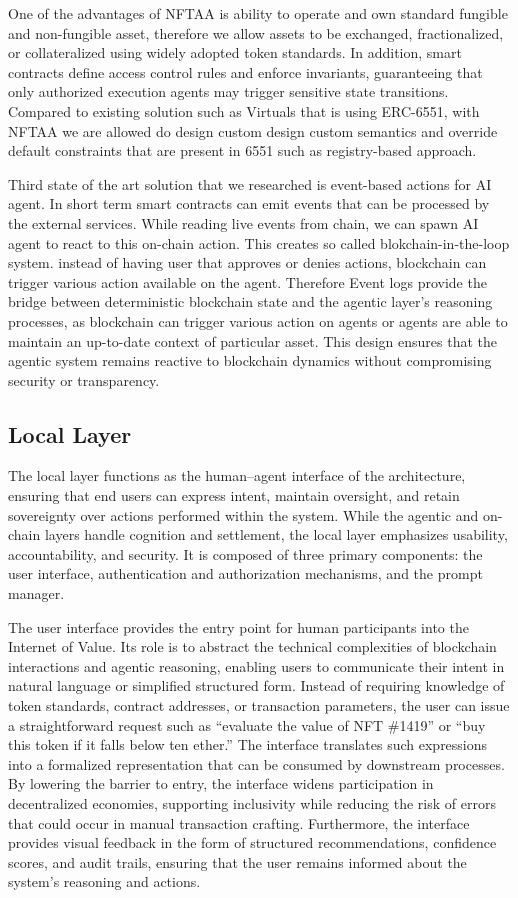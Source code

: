 One of the advantages of NFTAA is ability to operate and own standard fungible and non-fungible asset, therefore we allow assets to be exchanged, fractionalized, or collateralized using widely adopted token standards. In addition, smart contracts define access control rules and enforce invariants, guaranteeing that only authorized execution agents may trigger sensitive state transitions. Compared to existing solution such as Virtuals that is using ERC-6551, with NFTAA we are allowed do design custom design custom semantics and override default constraints that are present in 6551 such as registry-based approach.

Third state of the art solution that we researched is event-based actions for AI agent. In short term smart contracts can emit events that can be processed by the external services. While reading live events from chain, we can spawn AI agent to react to this on-chain action. This creates so called blokchain-in-the-loop system.
 instead of having user that approves or denies actions, blockchain can trigger various action available on the agent. Therefore Event logs provide the bridge between deterministic blockchain state and the agentic layer’s reasoning processes, as blockchain can trigger various action on agents or agents are able to maintain an up-to-date context of particular asset. This design ensures that the agentic system remains reactive to blockchain dynamics without compromising security or transparency.


\subsection{Local Layer}

The local layer functions as the human–agent interface of the architecture, ensuring that end users can express intent, maintain oversight, and retain sovereignty over actions performed within the system. While the agentic and on-chain layers handle cognition and settlement, the local layer emphasizes usability, accountability, and security. It is composed of three primary components: the user interface, authentication and authorization mechanisms, and the prompt manager.

The user interface provides the entry point for human participants into the Internet of Value. Its role is to abstract the technical complexities of blockchain interactions and agentic reasoning, enabling users to communicate their intent in natural language or simplified structured form. Instead of requiring knowledge of token standards, contract addresses, or transaction parameters, the user can issue a straightforward request such as ``evaluate the value of NFT \#1419'' or ``buy this token if it falls below ten ether.'' The interface translates such expressions into a formalized representation that can be consumed by downstream processes. By lowering the barrier to entry, the interface widens participation in decentralized economies, supporting inclusivity while reducing the risk of errors that could occur in manual transaction crafting. Furthermore, the interface provides visual feedback in the form of structured recommendations, confidence scores, and audit trails, ensuring that the user remains informed about the system’s reasoning and actions.


